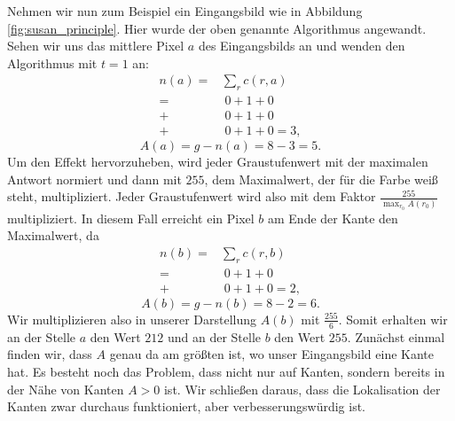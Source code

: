 \documentclass[a4paper, 11pt]{report}
\theoremstyle{definition}
\begin{document}
			Nehmen wir nun zum Beispiel ein Eingangsbild wie in Abbildung \ref{fig:susan_principle}. Hier wurde der oben genannte Algorithmus angewandt.
			Sehen wir uns das mittlere Pixel $a$ des Eingangsbilds an und wenden den Algorithmus mit $t=1$ an:
			\begin{align*}
				n(a) 	=&\sum_r c(r,a) \\
						=&\; 0 + 1 + 0 \\
						+&\; 0 + 1 + 0 \\
						+&\; 0 + 1 + 0 = 3,
			\end{align*}
			$$ A(a) = g - n(a) = 8 - 3 = 5. $$
			Um den Effekt hervorzuheben, wird jeder Graustufenwert mit der maximalen Antwort normiert und dann mit $255$, dem Maximalwert, der für die Farbe weiß steht, multipliziert. Jeder Graustufenwert wird also mit dem Faktor $\frac{255}{\max_{r_0}{A(r_0)}}$ multipliziert. In diesem Fall erreicht ein Pixel $b$ am Ende der Kante den Maximalwert, da
			\begin{align*}
				n(b) 	=&\sum_r c(r,b) \\
						=&\; 0 + 1 + 0 \\
						+&\; 0 + 1 + 0 = 2,
			\end{align*}
			$$ A(b) = g - n(b) = 8 - 2 = 6. $$
			Wir multiplizieren also in unserer Darstellung $A(b)$ mit $\frac{255}{6}$. Somit erhalten wir an der Stelle $a$ den Wert $212$ und an der Stelle $b$ den Wert $255$.
			Zunächst einmal finden wir, dass $A$ genau da am größten ist, wo unser Eingangsbild eine Kante hat. Es besteht noch das Problem, dass nicht nur auf Kanten, sondern bereits in der Nähe von Kanten $A > 0$ ist. Wir schließen daraus, dass die Lokalisation der Kanten zwar durchaus funktioniert, aber verbesserungswürdig ist.
\end{document}
